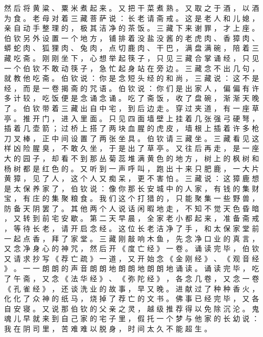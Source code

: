 {然 后 将 黄 粱 、 粟 米 煮 起 来 。
又 把 干 菜 煮 熟 。
又 取 之 于 酒 ， 以 酒 为 食 。
老 母 对 着 三 藏 菩 萨 说 ： 长 老 请 斋 戒 。
这 是 老 人 和 儿 媳 ， 亲 自 动 手 整 理 的 ， 极 其 洁 净 的 茶 饭 。
三 藏 下 来 谢 罪 ， 才 上 座 。
伯 钦 另 外 设 置 一 个 地 方 ， 铺 排 着 没 盐 没 酱 的 老 虎 肉 、 香 獐 肉 、 蟒 蛇 肉 、 狐 狸 肉 、 兔 肉 ， 点 切 鹿 肉 、 干 巴 ， 满 盘 满 碗 ， 陪 着 三 藏 吃 斋 。
刚 刚 坐 下 ， 心 想 举 起 筷 子 ， 只 见 三 藏 合 掌 诵 经 ， 只 见 一 个 伯 钦 不 敢 动 筷 子 ， 急 忙 起 身 站 在 旁 边 。
三 藏 念 不 出 几 句 ， 就 教 他 吃 斋 。
伯 钦 说 ： 你 是 念 短 头 经 的 和 尚 ， 三 藏 说 ： 这 不 是 经 ， 而 是 一 卷 揭 斋 的 咒 语 。
伯 钦 说 ： 你 们 是 出 家 人 ， 偏 偏 有 许 多 计 较 ， 吃 饭 便 是 念 诵 念 诵 。
吃 了 斋 饭 ， 收 了 盘 碗 ， 渐 渐 天 晚 了 。
伯 钦 带 着 三 藏 出 自 中 宅 ， 到 后 边 走 。
穿 过 夹 道 ， 有 一 座 草 亭 。
推 开 门 ， 进 入 里 面 。
只 见 四 面 墙 壁 上 挂 着 几 张 强 弓 硬 弩 ， 插 着 几 壶 箭 ； 过 桥 上 搭 了 两 块 血 腥 的 虎 皮 ， 墙 根 上 插 着 许 多 枪 刀 叉 棒 ， 正 中 间 设 置 了 两 张 坐 具 。
伯 钦 请 三 藏 坐 。
三 藏 看 见 这 样 凶 险 腥 臭 ， 不 敢 久 坐 ， 于 是 出 了 草 亭 。
又 往 后 再 走 ， 是 一 座 大 的 园 子 ， 却 看 不 到 那 丛 菊 蕊 堆 满 黄 色 的 地 方 ， 树 上 的 枫 树 和 杨 树 都 是 红 色 的 。
又 听 到 一 声 呼 叫 ， 跑 出 十 来 只 肥 鹿 ， 一 大 片 黄 獐 ， 见 了 人 ， 这 个 人 又 痴 呆 ， 更 不 害 怕 。
三 藏 说 ： 这 獐 鹿 想 是 太 保 养 家 了 ， 伯 钦 说 ： 像 你 那 长 安 城 中 的 人 家 ， 有 钱 的 集 财 宝 ， 有 庄 的 集 聚 粮 食 。
我 们 这 个 打 猎 的 ， 只 能 聚 集 一 些 野 兽 ， 防 备 天 阴 罢 了 。
其 他 两 个 人 说 话 闲 暇 地 走 ， 不 知 不 觉 天 色 昏 暗 ， 又 转 到 前 宅 安 歇 。
第 二 天 早 晨 ， 全 家 老 小 都 起 来 ， 准 备 斋 戒 ， 等 待 长 老 ， 请 开 启 念 经 。
这 位 长 老 洁 净 了 手 ， 和 太 保 家 堂 前 一 起 点 香 ， 拜 了 家 堂 。
三 藏 刚 敲 响 木 鱼 ， 先 念 净 口 业 的 真 言 ， 又 念 净 身 心 的 神 咒 ， 然 后 开 《 度 亡 经 》 一 卷 。
诵 读 完 毕 ， 伯 钦 又 请 求 抄 写 《 荐 亡 疏 》 一 道 ， 又 开 始 念 《 金 刚 经 》 、 《 观 音 经 》 。
一 一 朗 朗 的 声 音 朗 朗 地 朗 朗 地 朗 朗 地 诵 读 。
诵 读 完 毕 ， 吃 了 午 斋 ， 又 念 《 法 华 经 》 、 《 弥 陀 经 》 ， 各 念 几 卷 ， 又 念 一 卷 《 孔 雀 经 》 ， 还 谈 洗 业 的 故 事 ， 早 又 晚 。
进 献 过 了 种 种 香 火 ， 化 化 了 众 神 的 纸 马 ， 烧 掉 了 荐 亡 的 文 书 。
佛 事 已 经 完 毕 ， 又 各 自 安 寝 。
又 说 那 伯 钦 的 父 亲 之 灵 ， 越 级 推 荐 得 以 免 除 沉 沦 。 鬼 魂 儿 早 就 来 到 自 己 家 的 宅 子 里 ， 假 托 一 个 梦 与 他 家 的 长 幼 说 ： 我 在 阴 司 里 ， 苦 难 难 以 脱 身 ， 时 间 太 久 不 能 超 生 。
}
